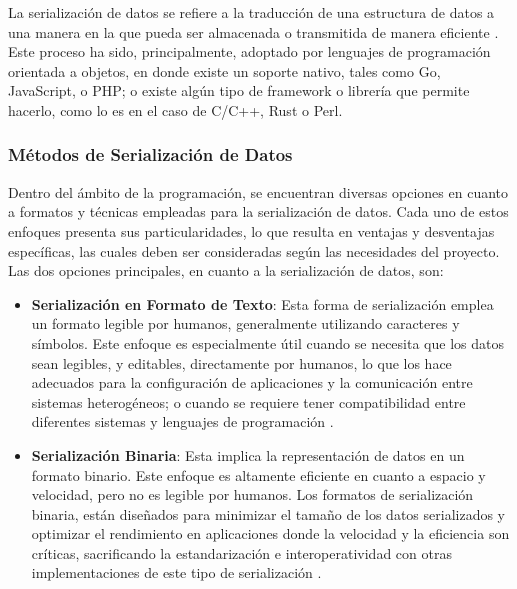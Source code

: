 La serialización de datos se refiere a la traducción de una estructura de datos a una manera en la que pueda ser almacenada o transmitida de manera eficiente \cite{mozillaSerialization}. Este proceso ha sido, principalmente, adoptado por lenguajes de programación orientada a objetos, en donde existe un soporte nativo, tales como Go, JavaScript, o PHP; o existe algún tipo de framework o librería que permite hacerlo, como lo es en el caso de C/C++, Rust o Perl.

\subsubsection{Métodos de Serialización de Datos}

Dentro del ámbito de la programación, se encuentran diversas opciones en cuanto a formatos y técnicas empleadas para la serialización de datos. Cada uno de estos enfoques presenta sus particularidades, lo que resulta en ventajas y desventajas específicas, las cuales deben ser consideradas según las necesidades del proyecto. Las dos opciones principales, en cuanto a la serialización de datos, son:

\begin{itemize}
    \item \textbf{Serialización en Formato de Texto}: Esta forma de serialización emplea un formato legible por humanos, generalmente utilizando caracteres y símbolos. Este enfoque es especialmente útil cuando se necesita que los datos sean legibles, y editables, directamente por humanos, lo que los hace adecuados para la configuración de aplicaciones y la comunicación entre sistemas heterogéneos; o cuando se requiere tener compatibilidad entre diferentes sistemas y lenguajes de programación \cite{Grochowski2019}.
    \item \textbf{Serialización Binaria}: Esta implica la representación de datos en un formato binario. Este enfoque es altamente eficiente en cuanto a espacio y velocidad, pero no es legible por humanos. Los formatos de serialización binaria, están diseñados para minimizar el tamaño de los datos serializados y optimizar el rendimiento en aplicaciones donde la velocidad y la eficiencia son críticas, sacrificando la estandarización e interoperatividad con otras implementaciones de este tipo de serialización \cite{Grochowski2019}.
\end{itemize}